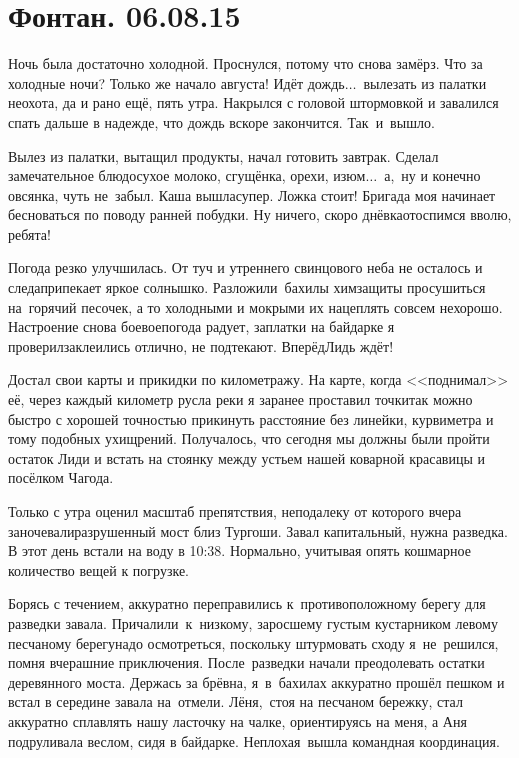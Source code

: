 \chapter{Фонтан. 06.08.15}

Ночь была достаточно холодной. Проснулся, потому что снова замёрз. Что за холодные ночи? Только же начало августа! Идёт дождь$\ldots$~вылезать из палатки неохота, да и рано ещё, пять утра. Накрылся с головой штормовкой и завалился спать дальше в надежде, что дождь вскоре закончится. Так~и~вышло. 

Вылез из палатки, вытащил продукты, начал готовить завтрак. Сделал замечательное блюдо\mdash сухое молоко, сгущёнка, орехи, изюм$\ldots$~а,~ну и конечно овсянка, чуть не~забыл. Каша вышла\mdash супер. Ложка стоит! Бригада моя начинает бесноваться по поводу ранней побудки. Ну ничего, скоро днёвка\mdash отоспимся вволю, ребята! 

Погода резко улучшилась. От туч и утреннего свинцового неба не осталось и следа\mdash припекает яркое солнышко. Разложили~бахилы химзащиты просушиться на~горячий песочек, а то холодными и мокрыми их нацеплять совсем нехорошо. Настроение снова боевое\mdash погода радует, заплатки на байдарке я проверил\mdash заклеились отлично, не подтекают. Вперёд\mdash Лидь ждёт! 

Достал свои карты и прикидки по километражу. На карте, когда <<поднимал>> её, через каждый километр русла реки я заранее проставил точки\mdash так можно быстро с хорошей точностью прикинуть расстояние без линейки, курвиметра и тому подобных ухищрений. Получалось, что сегодня мы должны были пройти остаток Лиди и встать на стоянку между устьем нашей коварной красавицы и посёлком Чагода.

Только с утра оценил масштаб препятствия, неподалеку от которого вчера заночевали\mdash разрушенный мост близ Тургоши. Завал капитальный, нужна разведка. В этот день встали на воду в 10:38. Нормально, учитывая опять кошмарное количество вещей к погрузке. 

Борясь с течением, аккуратно переправились к~противоположному берегу для разведки завала. Причалили~к~низкому, заросшему густым кустарником левому песчаному берегу\mdash надо осмотреться, поскольку штурмовать сходу я~не~решился, помня вчерашние приключения. После~разведки начали преодолевать остатки деревянного моста. Держась за брёвна, я~в~бахилах аккуратно прошёл пешком и встал в середине завала на~отмели. Лёня,~стоя на песчаном бережку, стал аккуратно сплавлять нашу ласточку на чалке, ориентируясь на меня, а Аня подруливала веслом, сидя в байдарке. Неплохая~вышла командная координация. 

